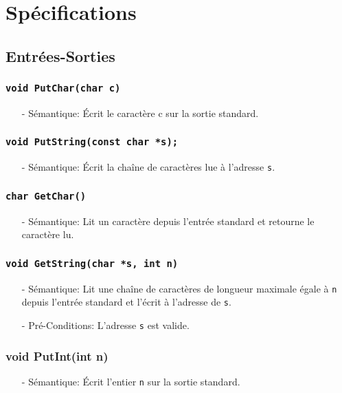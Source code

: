 \documentclass[11pt]{article}
\begin{document}
\section{Spécifications}
\subsection{Entrées-Sorties}

\subsubsection{\texttt{void PutChar(char c)}}
\begin{itemize}
\item[-] Sémantique: Écrit le caractère c sur la sortie standard.
\end{itemize}

\subsubsection{\texttt{void PutString(const char *s);}}
\begin{itemize}
\item[-] Sémantique: Écrit la chaîne de caractères lue à l'adresse \texttt{s}.
\end{itemize}

\subsubsection{\texttt{char GetChar()}}
\begin{itemize}
\item[-] Sémantique: Lit un caractère depuis l'entrée standard et retourne le caractère lu.
\end{itemize}

\subsubsection{\texttt{void GetString(char *s, int n)}}
\begin{itemize}
\item[-] Sémantique:
  Lit une chaîne de caractères de longueur maximale égale à \texttt{n} depuis l'entrée standard et
  l'écrit à l'adresse de \texttt{s}.
\item[-] Pré-Conditions: L'adresse \texttt{s} est valide.
\end{itemize}

\subsubsection{void PutInt(int n)}
\begin{itemize}
\item[-] Sémantique: Écrit l'entier \texttt{n} sur la sortie standard.
\end{itemize}
\end{document}
